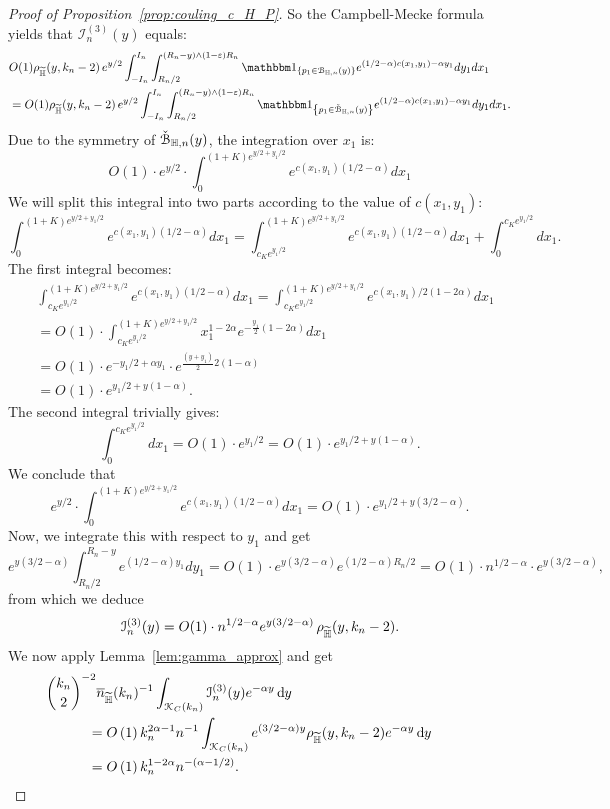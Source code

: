 \begin{proof}[Proof of Proposition~\ref{prop:couling_c_H_P}]
So the Campbell-Mecke formula yields that $\mathcal{I}_n^{(3)}(y)$ equals: 
\begin{equation}
\begin{split}
 	&O(1) \rho_{\HP}(y,k_n-2) \, e^{y/2} \int_{-I_n}^{I_n} \int_{R_n/2}^{(R_n - y) \wedge (1-\eps)R_n}  
		\ind{p_1 \in \BallHyp{y}} e^{(1/2 -\alpha) c(x_1,y_1) - \alpha y_1} dy_1dx_1 \\
	&= O(1) \rho_{\HP}(y,k_n-2) \, e^{y/2} \int_{-I_n}^{I_n} \int_{R_n/2}^{(R_n - y) \wedge (1-\eps)R_n}  
		\ind{p_1 \in \FatBallHyp{y}} e^{(1/2 -\alpha) c(x_1,y_1) - \alpha y_1} dy_1dx_1.
\end{split}
\end{equation}
Due to the symmetry of $\check{{\mathcal B}}_{\mathbb{H},n}(y)$, the integration over $x_1$ is: 
\[
	O(1) \cdot e^{y/2} \cdot \int_0^{(1+K)e^{y/2 + y_1/2}} e^{c(x_1,y_1) (1/2 -\alpha)} dx_1
\]
We will split this integral into two parts according to the value of $c(x_1,y_1)$:
\[
\int_0^{(1+K) e^{y/2 + y_1/2}} e^{c(x_1,y_1) (1/2 -\alpha)} dx_1 = 
\int_{c_K e^{y_1/2}}^{(1+K)e^{y/2 + y_1/2}} e^{c(x_1,y_1) (1/2 -\alpha)} dx_1 + \int_0^{c_K e^{y_1/2}} dx_1.
\]
The first integral becomes: 
\begin{equation*}
\begin{split} 
&\int_{c_K e^{y_1/2}}^{(1+K)e^{y/2 + y_1/2}} e^{c(x_1,y_1) (1/2 -\alpha)} dx_1  = 
\int_{c_K e^{y_1/2}}^{(1+K)e^{y/2 + y_1/2}} e^{c(x_1,y_1)/2 (1 -2\alpha)} dx_1  \\
&= O(1)\cdot \int_{c_K e^{y_1/2}}^{(1+K)e^{y/2 + y_1/2}} x_1^{1 -2\alpha} 
e^{-\frac{y_1}{2} (1-2\alpha)} dx_1 \\
&= O(1) \cdot e^{-y_1/2 + \alpha y_1} \cdot e^{\frac{(y+y_1)}{2} 2(1-\alpha)} \\
&=O(1) \cdot e^{y_1/2 +y(1-\alpha)}.  
\end{split}
\end{equation*}
The second integral trivially gives: 
\[
	\int_0^{c_K e^{y_1/2}} dx_1 = O(1) \cdot e^{y_1/2} = O(1) \cdot e^{y_1/2 +y(1-\alpha)}.
\]
We conclude that 
\[
	e^{y/2} \cdot \int_0^{(1+K)e^{y/2 + y_1/2}} e^{c(x_1,y_1) (1/2 -\alpha)} dx_1 = 
	O(1) \cdot e^{y_1/2 +y(3/2-\alpha)}.
\]
Now, we integrate this with respect to $y_1$ and get 
\[
	e^{y(3/2 -\alpha)} \int_{R_n/2}^{R_n-y} e^{(1/2-\alpha)y_1} dy_1 =  O(1) \cdot e^{y(3/2 -\alpha)} 
	e^{(1/2 -\alpha) R_n/2} = O(1) \cdot n^{1/2 -\alpha} \cdot e^{y(3/2 - \alpha)},
\]
from which we deduce
\begin{equation} \label{eq:term3_intermediate}
	\mathcal{I}_n^{(3)}(y) = 
	O(1) \cdot n^{1/2 -\alpha} e^{y(3/2 - \alpha)} \, \rho_{\widetilde{\mathbb{H}}}(y,k_n-2). 
\end{equation}
We now apply Lemma~\ref{lem:gamma_approx} and get 
\begin{align*}
	&\hspace{-30pt}\binom{k_n}{2}^{-2} \expH^{-1} \int_{\Kcal_{C}(k_n)} \mathcal{I}_n^{(3)}(y) e^{-\alpha y} \dd y\\
	&= \bigO{1} k_n^{2\alpha - 1} n^{-1} \int_{\Kcal_{C}(k_n)} e^{(3/2 - \alpha)y} \rho_{\HP}(y,k_n-2) e^{-\alpha y} \dd y\\
	&= \bigO{1} k_n^{1 - 2\alpha} n^{-(\alpha - 1/2)}.
\end{align*}


\end{proof}
